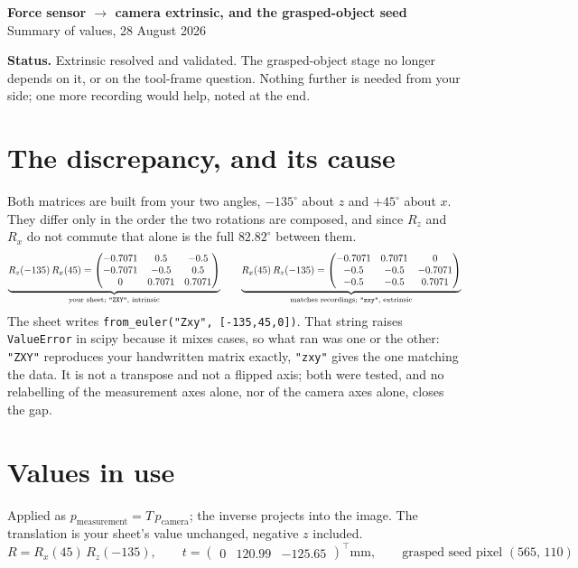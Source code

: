 \documentclass[10pt,a4paper]{article}
\begin{document}
\begin{center}
{\large\bfseries Force sensor $\rightarrow$ camera extrinsic, and the grasped-object seed}\\[1pt]
{\small Summary of values, 28 August 2026}
\end{center}

\textbf{Status.} Extrinsic resolved and validated. The grasped-object stage no longer depends on
it, or on the tool-frame question. Nothing further is needed from your side; one more recording
would help, noted at the end.

\section{The discrepancy, and its cause}
Both matrices are built from your two angles, $-135^\circ$ about $z$ and $+45^\circ$ about $x$.
They differ only in the order the two rotations are composed, and since $R_z$ and $R_x$ do not
commute that alone is the full $82.82^\circ$ between them.
\[
\underbrace{R_z(-135)\,R_x(45) =
\begin{pmatrix} -0.7071 & 0.5 & -0.5\\ -0.7071 & -0.5 & 0.5\\ 0 & 0.7071 & 0.7071\end{pmatrix}}_{\text{your sheet; \texttt{"ZXY"}, intrinsic}}
\qquad
\underbrace{R_x(45)\,R_z(-135) =
\begin{pmatrix} -0.7071 & 0.7071 & 0\\ -0.5 & -0.5 & -0.7071\\ -0.5 & -0.5 & 0.7071\end{pmatrix}}_{\text{matches recordings; \texttt{"zxy"}, extrinsic}}
\]
The sheet writes \texttt{from\_euler("Zxy", [-135,45,0])}. That string raises \texttt{ValueError}
in scipy because it mixes cases, so what ran was one or the other: \texttt{"ZXY"} reproduces your
handwritten matrix exactly, \texttt{"zxy"} gives the one matching the data. It is not a transpose
and not a flipped axis; both were tested, and no relabelling of the measurement axes alone, nor
of the camera axes alone, closes the gap.

\section{Values in use}
Applied as $p_{\text{measurement}} = T\, p_{\text{camera}}$; the inverse projects into the image.
The translation is your sheet's value unchanged, negative $z$ included.
\[
R = R_x(45)\,R_z(-135), \qquad
t = \begin{pmatrix} 0 & 120.99 & -125.65\end{pmatrix}^{\!\top}\text{mm}, \qquad
\text{grasped seed pixel } (565,\,110)
\]
\end{document}
